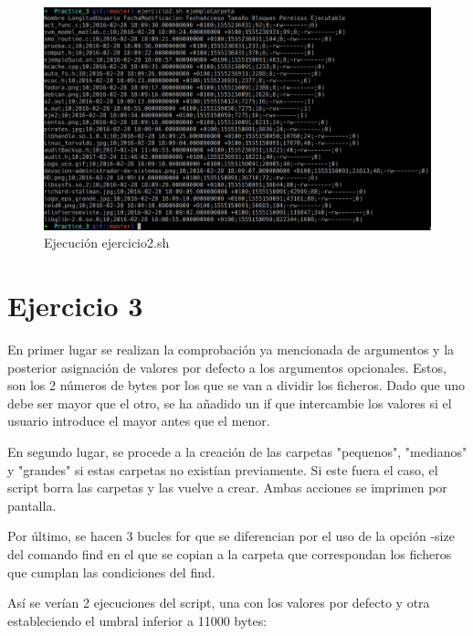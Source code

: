 \documentclass{article}
\begin{document}
\begin{figure}[ht]
    \centering
    \includegraphics[width=1\textwidth]{ejercicio2.png}
    \caption{Ejecución ejercicio2.sh}
\end{figure}

\section{Ejercicio 3}
En primer lugar se realizan la comprobación ya mencionada de argumentos y la posterior asignación de valores por defecto a los argumentos opcionales. Estos, son los 2 números de bytes por los que se van a dividir los ficheros. Dado que uno debe ser mayor que el otro, se ha añadido un if que intercambie los valores si el usuario introduce el mayor antes que el menor.\par
En segundo lugar, se procede a la creación de las carpetas "pequenos", "medianos" y "grandes" si estas carpetas no existían previamente. Si este fuera el caso, el script borra las carpetas y las vuelve a crear. Ambas acciones se imprimen por pantalla.\par
Por último, se hacen 3 bucles for que se diferencian por el uso de la opción -size del comando find en el que se copian a la carpeta que correspondan los ficheros que cumplan las condiciones del find.\par
Así se verían 2 ejecuciones del script, una con los valores por defecto y otra estableciendo el umbral inferior a 11000 bytes:
\end{document}
